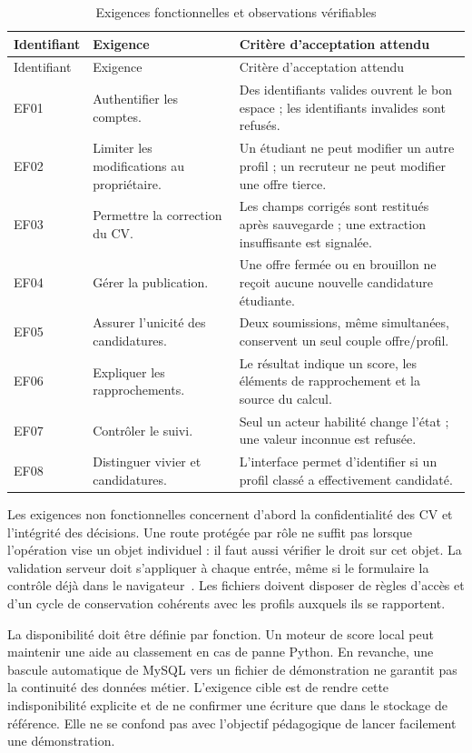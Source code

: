 \begin{longtable}{@{}P{0.13\textwidth}P{0.30\textwidth}P{0.50\textwidth}@{}}
\caption{Exigences fonctionnelles et observations vérifiables}\label{tab:exigences-fonctionnelles}\\
\toprule
Identifiant & Exigence & Critère d'acceptation attendu \\
\midrule
\endfirsthead
\toprule
Identifiant & Exigence & Critère d'acceptation attendu \\
\midrule
\endhead
EF01 & Authentifier les comptes. & Des identifiants valides ouvrent le bon espace ; les identifiants invalides sont refusés. \\
EF02 & Limiter les modifications au propriétaire. & Un étudiant ne peut modifier un autre profil ; un recruteur ne peut modifier une offre tierce. \\
EF03 & Permettre la correction du CV. & Les champs corrigés sont restitués après sauvegarde ; une extraction insuffisante est signalée. \\
EF04 & Gérer la publication. & Une offre fermée ou en brouillon ne reçoit aucune nouvelle candidature étudiante. \\
EF05 & Assurer l'unicité des candidatures. & Deux soumissions, même simultanées, conservent un seul couple offre/profil. \\
EF06 & Expliquer les rapprochements. & Le résultat indique un score, les éléments de rapprochement et la source du calcul. \\
EF07 & Contrôler le suivi. & Seul un acteur habilité change l'état ; une valeur inconnue est refusée. \\
EF08 & Distinguer vivier et candidatures. & L'interface permet d'identifier si un profil classé a effectivement candidaté. \\
\bottomrule
\end{longtable}

Les exigences non fonctionnelles concernent d'abord la confidentialité des CV et l'intégrité des décisions. Une route protégée par rôle ne suffit pas lorsque l'opération vise un objet individuel : il faut aussi vérifier le droit sur cet objet. La validation serveur doit s'appliquer à chaque entrée, même si le formulaire la contrôle déjà dans le navigateur~\cite{laravel-validation}. Les fichiers doivent disposer de règles d'accès et d'un cycle de conservation cohérents avec les profils auxquels ils se rapportent.

La disponibilité doit être définie par fonction. Un moteur de score local peut maintenir une aide au classement en cas de panne Python. En revanche, une bascule automatique de MySQL vers un fichier de démonstration ne garantit pas la continuité des données métier. L'exigence cible est de rendre cette indisponibilité explicite et de ne confirmer une écriture que dans le stockage de référence. Elle ne se confond pas avec l'objectif pédagogique de lancer facilement une démonstration.

